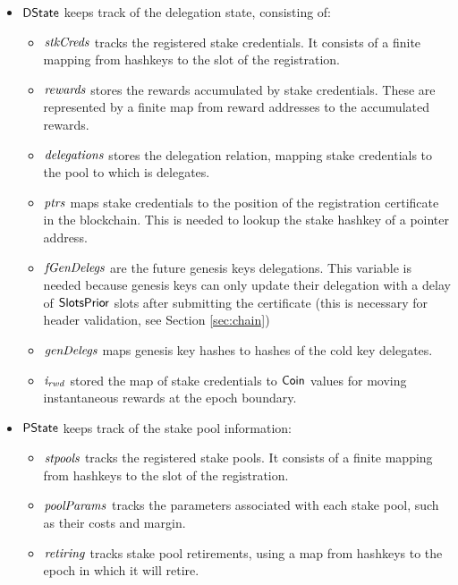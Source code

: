 \begin{itemize}
  \item $\mathsf{DState}$ keeps track of the delegation state, consisting of:
    \begin{itemize}
    \item $\mathit{stkCreds}$ tracks the registered stake credentials. It consists
      of a finite mapping from hashkeys to the slot of the registration.
    \item $\mathit{rewards}$ stores the rewards accumulated by stake credentials.
      These are represented by a finite map from reward addresses to the
      accumulated rewards.
    \item $\mathit{delegations}$ stores the delegation relation, mapping stake
      credentials to the pool to which is delegates.
    \item $\mathit{ptrs}$ maps stake credentials to the position of the
      registration certificate in the blockchain. This is needed to lookup the
      stake hashkey of a pointer address.
      \item $\mathit{fGenDelegs}$ are the future genesis keys delegations. This variable
      is needed because genesis keys can only update their delegation with a
      delay of $\mathsf{SlotsPrior}$ slots after submitting the certificate (this is
      necessary for header validation, see Section \ref{sec:chain})
      \item $\mathit{genDelegs}$ maps genesis key hashes to hashes of the cold key
        delegates.
      \item $\mathit{i_{rwd}}$ stored the map of stake credentials to $\mathsf{Coin}$
        values for moving instantaneous rewards at the epoch boundary.
    \end{itemize}
  \item $\mathsf{PState}$ keeps track of the stake pool information:
    \begin{itemize}
      \item $\mathit{stpools}$ tracks the registered stake pools. It consists of a finite
        mapping from hashkeys to the slot of the registration.
      \item $\mathit{poolParams}$ tracks the parameters associated with each stake pool, such as
        their costs and margin.
      \item $\mathit{retiring}$ tracks stake pool retirements, using a map from hashkeys to
        the epoch in which it will retire.
    \end{itemize}
\end{itemize}

